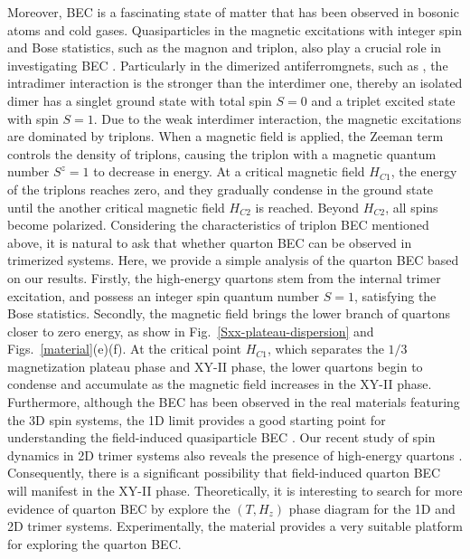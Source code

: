 \documentclass[aps,prx,showpacs,floatfix,twocolumn,superscriptaddress,nofootinbib,longbibliography]{revtex4-2}
\begin{document}
 Moreover, BEC is a fascinating state of matter that has been observed in bosonic atoms and cold gases. Quasiparticles in the magnetic excitations with integer spin and Bose statistics, such as the magnon and triplon, also play a crucial role in investigating   BEC \cite{ruegg2003bose,giamarchi2008bose,zapf2014bose}. Particularly in the dimerized antiferromgnets, such as , the  intradimer interaction is the stronger than the interdimer one, thereby an isolated dimer has a singlet ground state with total spin $S=0$ and a triplet excited state with spin $S=1$. Due to the weak interdimer interaction, the magnetic excitations are dominated by triplons. When a magnetic field is applied, the Zeeman term controls the density of triplons, causing  the triplon with a magnetic quantum number $S^z=1$ to decrease in energy. At a critical magnetic field $H_{C1}$, the energy of the triplons reaches zero, and they gradually condense in the ground state until the another critical magnetic field $H_{C2}$ is reached. Beyond $H_{C2}$, all spins become polarized. Considering the characteristics of triplon BEC mentioned above,  it is natural to ask that  whether quarton BEC can be observed in trimerized systems. Here, we provide a simple analysis of the quarton BEC based on our results.  Firstly, the high-energy quartons stem from the internal trimer excitation, and possess an integer spin quantum number $S=1$, satisfying the Bose statistics. Secondly, the magnetic field brings   the lower branch of quartons closer to zero energy, as show in Fig.~\ref{Sxx-plateau-dispersion} and Figs.~\ref{material}(e)(f). At the critical point $H_{C1}$, which separates the $1/3$ magnetization plateau phase and XY-II phase, the lower quartons begin to condense and accumulate as the magnetic field increases in the XY-II phase.  Furthermore, although the BEC has been observed in the real materials featuring the 3D spin systems,  the 1D limit provides a good starting point for understanding the field-induced  quasiparticle
BEC \cite{zapf2014bose,volkov2020magnon}. Our recent study of  spin dynamics in 2D trimer systems also reveals the presence of high-energy quartons \cite{chang2023magnon}. 
Consequently,  there is a significant possibility that field-induced quarton BEC will manifest in the XY-II phase. 
 Theoretically, it is interesting to search for more evidence of quarton BEC by explore the $(T,H_z)$ phase diagram for the 1D and 2D trimer systems. Experimentally,
the material  provides a very suitable platform for exploring the  quarton BEC.
\end{document}
